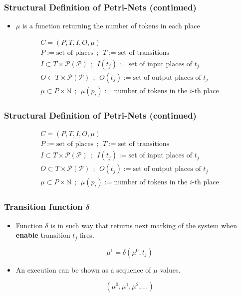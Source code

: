 \begin{frame}
    \frametitle{Structural Definition of Petri-Nets (continued)}
    \begin{itemize}
        \item {$\mu$ is a function returning the number of tokens in each place}
    \end{itemize}
    \begin{gather*}
        C = (P, T, I, O, \mu) \\
        P := \text{set of places}~~;~~
        T := \text{set of transitions} \\
        I \subset T \times \mathcal{P(P)}~~;~~
        I(t_j) := \text{set of input places of $t_j$} \\
        O \subset T \times \mathcal{P(P)} ~~;~~
        O(t_j) := \text{set of output places of $t_j$} \\
        \mu \subset P \times \mathbb{N}~~;~~
        \mu(p_i) := \text{number of tokens in the $i$-th place}
    \end{gather*}
\end{frame}
\begin{frame}
    \frametitle{Structural Definition of Petri-Nets (continued)}
    \begin{gather*}
        C = (P, T, I, O, \mu) \\
        P := \text{set of places}~~;~~
        T := \text{set of transitions} \\
        I \subset T \times \mathcal{P(P)}~~;~~
        I(t_j) := \text{set of input places of $t_j$} \\
        O \subset T \times \mathcal{P(P)} ~~;~~
        O(t_j) := \text{set of output places of $t_j$} \\
        \mu \subset P \times \mathbb{N}~~;~~
        \mu(p_i) := \text{number of tokens in the $i$-th place}
    \end{gather*}
\end{frame}

\begin{frame}
    \frametitle{Transition function $\delta$}
    \begin{itemize}
        \item {Function $\delta$ is in such way that returns next marking of the system when \textbf{enable} transition $t_j$ fires.}
    \end{itemize}
    \[\mu ^ 1 = \delta(\mu^0, t_j)\]
    \begin{itemize}
        \item {An execution can be shown as a sequence of $\mu$ values.}
    \end{itemize}
    \[(\mu^0, \mu^1, \mu^2, ...)\]
\end{frame}

